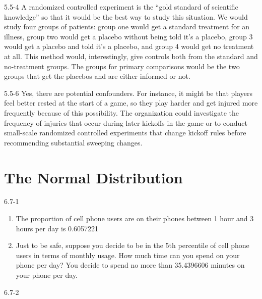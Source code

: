 \begin{exsol@solution}{5.5-4}
A randomized controlled experiment is the ``gold standard of scientific knowledge'' so that it would be the best way to study this situation. We would study four groups of patients: group one would get a standard treatment for an illness, group two would get a placebo without being told it's a placebo, group 3 would get a placebo and told it's a placebo, and group 4 would get no treatment at all. This method would, interestingly, give controls both from the standard and no-treatment groups. The groups for primary comparisons would be the two groups that get the placebos and are either informed or not.

\end{exsol@solution}
\begin{exsol@solution}{5.5-6}
Yes, there are potential confounders. For instance, it might be that players feel better rested at the start of a game, so they play harder and get injured more frequently because of this possibility. The organization could investigate the frequency of injuries that occur during later kickoffs in the game or to conduct small-scale randomized controlled experiments that change kickoff rules before recommending substantial sweeping changes.

\end{exsol@solution}
\setcounter{chapter}{5}\chapter{The Normal Distribution}
\begin{exsol@solution}{6.7-1}

\begin{enumerate}
	\item The proportion of cell phone users are on their phones between 1 hour
and 3 hours per day is 0.6057221
  \item Just to be safe, suppose you decide to be in the 5th percentile of
cell phone users in terms of monthly usage.  How much time can you spend on your phone per day? You decide to spend no more than 35.4396606 minutes on your phone per day.
	\end{enumerate}
\end{exsol@solution}
\begin{exsol@solution}{6.7-2}
%

\end{exsol@solution}
